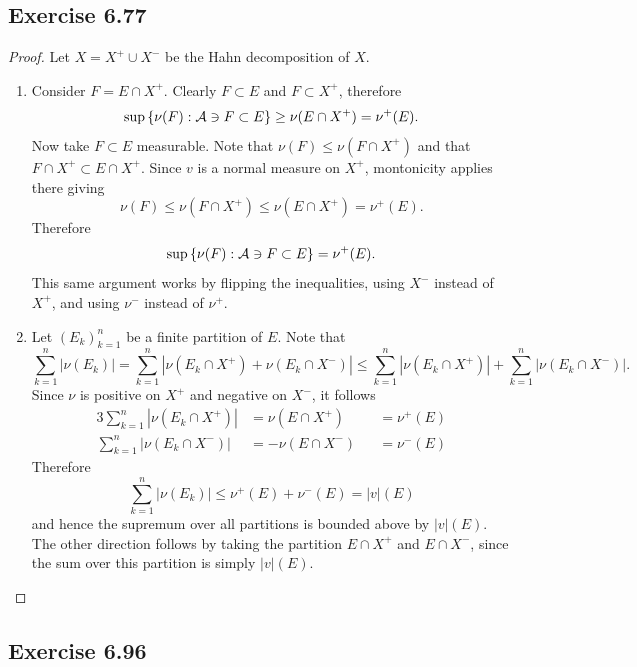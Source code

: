 \documentclass[hw_all.tex]{subfiles}
\begin{document}
\subsection{Exercise 6.77}
\begin{proof}
    Let $X = X^+ \cup X^-$ be the Hahn decomposition of $X$.

    \begin{enumerate}
        \item
            Consider $F = E \cap X^+$. Clearly $F \subset E$ and $F \subset X^+$, therefore
            \[
                \sup\qty{\nu(F) : \mathcal{A} \ni F \subset E} \geq \nu(E \cap X^+) = \nu^+(E)
            .\]
            Now take $F \subset E$ measurable. Note that $\nu(F) \leq \nu(F \cap X^+)$ and that $F \cap X^+ \subset E \cap X^+$. Since $v$ is a normal measure on $X^+$, montonicity applies there giving
            \[
                \nu(F) \leq \nu(F \cap X^+) \leq \nu(E \cap X^+) = \nu^+(E)
            .\]
            Therefore
            \[
                \sup\qty{\nu(F) : \mathcal{A} \ni F \subset E} = \nu^+(E)
            .\]
            This same argument works by flipping the inequalities, using $X^-$ instead of $X^+$, and using $\nu^-$ instead of $\nu^+$.

        \item 
            Let $(E_k)_{k=1}^n$ be a finite partition of $E$. Note that
            \[
                \sum_{k=1}^n |\nu(E_k)| = \sum_{k=1}^n |\nu(E_k \cap X^+) + \nu(E_k \cap X^-)| \leq \sum_{k=1}^n |\nu(E_k \cap X^+)| + \sum_{k=1}^n |\nu(E_k \cap X^-)|
            .\]
            Since $\nu$ is positive on $X^+$ and negative on $X^-$, it follows
            \begin{alignat*}{3}
                \sum_{k=1}^n |\nu(E_k \cap X^+)| &= \nu(E \cap X^+)  &&= \nu^+(E) \\
                \sum_{k=1}^n |\nu(E_k \cap X^-)| &= -\nu(E \cap X^-) &&= \nu^-(E)
            \end{alignat*}
            Therefore
            \[
                \sum_{k=1}^n |\nu(E_k)| \leq \nu^+(E) + \nu^-(E) = |v|(E)
            \]
        and hence the supremum over all partitions is bounded above by $|v|(E)$. The other direction follows by taking the partition $E \cap X^+$ and $E \cap X^-$, since the sum over this partition is simply $|v|(E)$.
    \end{enumerate}
\end{proof}

\subsection{Exercise 6.96}
\end{document}
